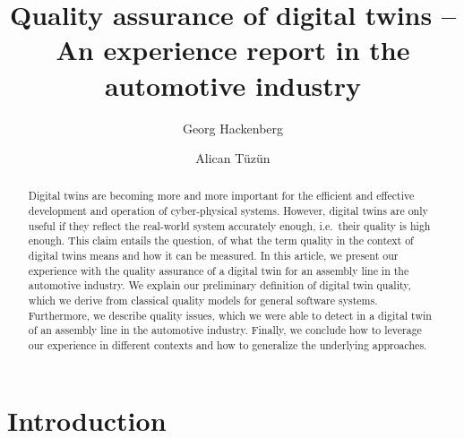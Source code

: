 \documentclass{llncs}
\begin{document}
    \title{Quality assurance of digital twins -- An experience report in the automotive industry}

    \author{Georg Hackenberg
    \and
    Alican Tüzün
    }
    
    \maketitle

    \begin{abstract}
        Digital twins are becoming more and more important for the efficient and effective development and operation of cyber-physical systems.
        However, digital twins are only useful if they reflect the real-world system accurately enough, i.e.\ their quality is high enough.
        This claim entails the question, of what the term quality in the context of digital twins means and how it can be measured.
        In this article, we present our experience with the quality assurance of a digital twin for an assembly line in the automotive industry.
        We explain our preliminary definition of digital twin quality, which we derive from classical quality models for general software systems.
        Furthermore, we describe quality issues, which we were able to detect in a digital twin of an assembly line in the automotive industry.
        Finally, we conclude how to leverage our experience in different contexts and how to generalize the underlying approaches.
    \end{abstract}

    \section{Introduction}\label{section:introduction}
    
\end{document}
